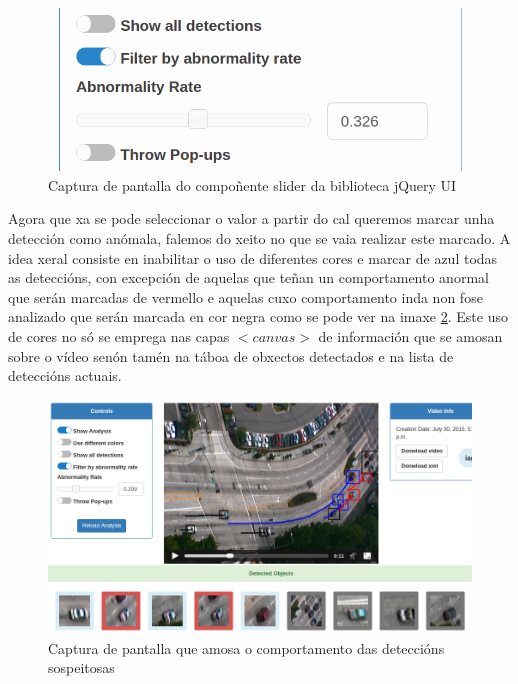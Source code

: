    \begin{figure}[htp]
    \begin{center}
        \includegraphics[scale=0.5]{figures/sliderCapture.png}
        \caption{Captura de pantalla do compoñente slider da biblioteca jQuery UI}
    \label{fig:sliderCapture}
    \end{center}
    \end{figure}
    
    Agora que xa se pode seleccionar o valor a partir do cal queremos marcar unha detección como
    anómala, falemos do xeito no que se vaia realizar este marcado. A idea xeral consiste en 
    inabilitar o uso de diferentes cores e marcar de azul todas as deteccións, con excepción de 
    aquelas que teñan un comportamento anormal que serán marcadas de vermello e aquelas cuxo 
    comportamento inda non fose analizado que serán marcada en cor negra como se pode ver na imaxe
    \ref{fig:suspiciousDetections}. Este uso de cores no só
    se emprega nas capas $<canvas>$ de información que se amosan sobre o vídeo senón tamén na táboa
    de obxectos detectados e na lista de deteccións actuais.

    \begin{figure}[htp]
    \begin{center}
        \includegraphics[scale=0.4]{figures/suspiciousDetections.png}
        \caption{Captura de pantalla que amosa o comportamento das deteccións sospeitosas}
    \label{fig:suspiciousDetections}
    \end{center}
    \end{figure}
    
